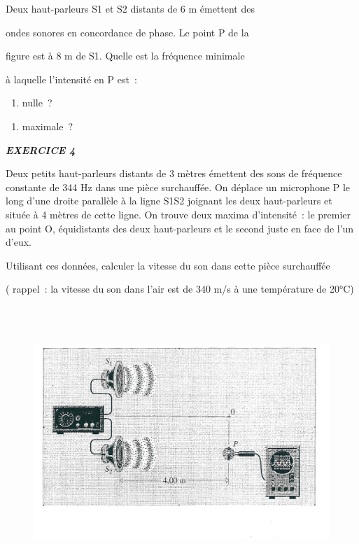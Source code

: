 {Deux haut-parleurs S1 et S2 distants de 6 m émettent des

ondes sonores en concordance de phase. Le point P de la

figure est à 8 m de S1. Quelle est la fréquence minimale

à laquelle l'intensité en P est~:

\begin{enumerate}
\def\labelenumi{\alph{enumi})}
\tightlist
\item
  nulle~?
\end{enumerate}

\begin{enumerate}
\def\labelenumi{\alph{enumi})}
\tightlist
\item
  maximale~?
\end{enumerate}

\emph{\textbf{EXERCICE 4}}

Deux petits haut-parleurs distants de 3 mètres émettent des sons de
fréquence constante de 344 Hz dans une pièce surchauffée. On déplace un
microphone P le long d'une droite parallèle à la ligne S1S2 joignant les
deux haut-parleurs et située à 4 mètres de cette ligne. On trouve deux
maxima d'intensité~: le premier au point O, équidistants des deux
haut-parleurs et le second juste en face de l'un d'eux.

Utilisant ces données, calculer la vitesse du son dans cette pièce
surchauffée

( rappel~: la vitesse du son dans l'air est de 340 m/s à une température
de 20°C)

\begin{figure}
\centering
\includegraphics[width=15.663cm,height=10.231cm]{Pictures/100000010000062500000404B4675BF2C4CE1EEC.png}
\caption{}
\end{figure}

}

